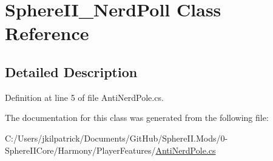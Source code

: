 \hypertarget{class_sphere_i_i___nerd_poll}{}\section{Sphere\+I\+I\+\_\+\+Nerd\+Poll Class Reference}
\label{class_sphere_i_i___nerd_poll}


\subsection{Detailed Description}


Definition at line 5 of file Anti\+Nerd\+Pole.\+cs.



The documentation for this class was generated from the following file\+:\begin{DoxyCompactItemize}
\item 
C\+:/\+Users/jkilpatrick/\+Documents/\+Git\+Hub/\+Sphere\+I\+I.\+Mods/0-\/\+Sphere\+I\+I\+Core/\+Harmony/\+Player\+Features/\mbox{\hyperlink{_anti_nerd_pole_8cs}{Anti\+Nerd\+Pole.\+cs}}\end{DoxyCompactItemize}
